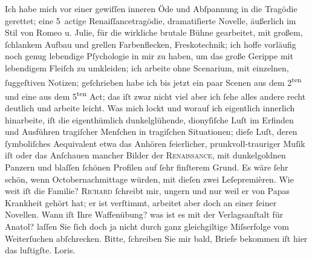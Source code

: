 \pstart
           Ich habe mich vor einer gewiſſen inneren Öde und Abſpannung in die Tragödie gerettet; eine 5 actige Renaiſſancetragödie,
               dramatiſierte Novelle, äußerlich im Stil von Romeo u.
                  Julie, für die wirkliche brutale Bühne gearbeitet, mit {\pb}großem, ſchlankem Aufbau und
               grellen Farbenflecken, Freskotechnik; ich hoffe vorläufig noch genug lebendige
               Pſychologie in mir zu haben, um das große Gerippe mit lebendigem Fleiſch zu
               umkleiden; ich arbeite ohne Scenarium, mit einzelnen, ſuggeſtiven Notizen;
               geſchrieben habe ich bis jetzt ein paar Scenen aus dem 2\textsuperscript{ten} und eine aus dem 5\textsuperscript{ten} Act; das iſt zwar
               nicht viel aber ich ſehe alles andere recht deutlich und arbeite leicht. Was mich
               lockt und worauf ich eigentlich innerlich hinarbeite, iſt die eigenthümlich
               dunkelglühende, dionyſiſche Luſt im Erfinden und Ausführen tragiſcher Menſchen in
               tragiſchen Situationen; dieſe Luſt, deren ſymboliſches Aequivalent etwa das Anhören
                  {\pb}feierlicher,
               prunkvoll-trauriger Muſik iſt oder das Anſchauen mancher Bilder der \textsc{Renaissance}, mit dunkelgoldnen Panzern und blaſſen ſchönen
               Profilen auf ſehr finſterem Grund. Es wäre ſehr schön, wenn Octobernachmittage
               würden, mit dieſen zwei Leſepremièren. Wie weit iſt die Familie? \hspace*{2em}\textsc{Richard}{ }ſchreibt mir, ungern und nur weil er von Papas Krankheit gehört hat;
               er ist verſtimmt, arbeitet aber doch an einer ſeiner Novellen. Wann iſt Ihre Waffenübung? was
               ist es mit der Verlagsanſtalt für Anatol? laſſen
               Sie ſich doch ja nicht durch ganz gleichgiltige Miſserfolge vom Weiterſuchen
               abſchrecken. Bitte, ſchreiben Sie mir bald, Briefe bekommen iſt hier das
               luſtigſte.\pend
           \pstart \spacefill\mbox{Loris.}\pend{}\endnumbering{}  
      